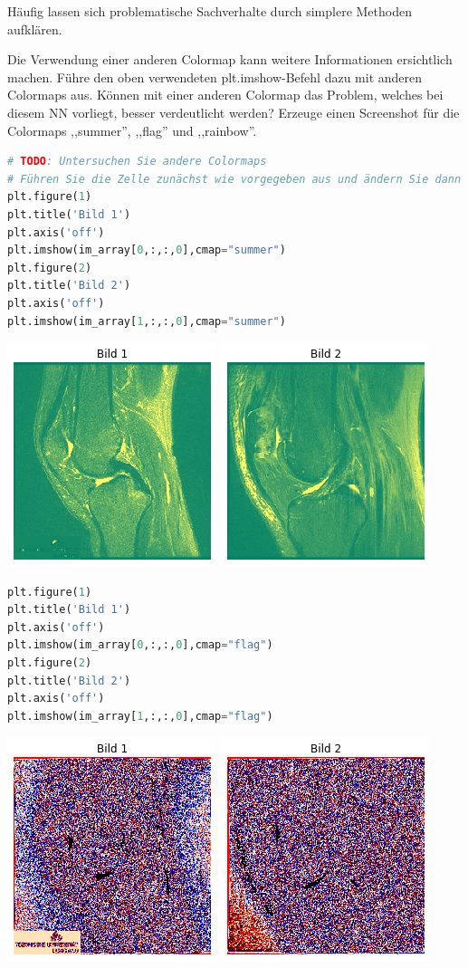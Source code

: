 \documentclass[a4paper,10pt,titlepage]{scrartcl}
\begin{document}
Häufig lassen sich problematische Sachverhalte durch simplere Methoden aufklären.

Die Verwendung einer anderen Colormap kann weitere Informationen ersichtlich machen. Führe den oben verwendeten plt.imshow-Befehl dazu mit anderen Colormaps aus. Können mit einer anderen Colormap das Problem, welches bei diesem NN vorliegt, besser verdeutlicht werden? Erzeuge einen Screenshot für die Colormaps ,,summer'', ,,flag'' und ,,rainbow''.

\begin{lstlisting}[language=python]
# TODO: Untersuchen Sie andere Colormaps
# Führen Sie die Zelle zunächst wie vorgegeben aus und ändern Sie dann die Colormap
plt.figure(1)
plt.title('Bild 1')
plt.axis('off')
plt.imshow(im_array[0,:,:,0],cmap="summer")
plt.figure(2)
plt.title('Bild 2')
plt.axis('off')
plt.imshow(im_array[1,:,:,0],cmap="summer")
\end{lstlisting}
\begin{center}
    \includegraphics[width=.2\linewidth]{Assets/prakBMT-DeepLearning-10.png}
    \includegraphics[width=.2\linewidth]{Assets/prakBMT-DeepLearning-11.png}
\end{center}

\begin{lstlisting}[language=python]
plt.figure(1)
plt.title('Bild 1')
plt.axis('off')
plt.imshow(im_array[0,:,:,0],cmap="flag")
plt.figure(2)
plt.title('Bild 2')
plt.axis('off')
plt.imshow(im_array[1,:,:,0],cmap="flag")
\end{lstlisting}
\begin{center}
    \includegraphics[width=.2\linewidth]{Assets/prakBMT-DeepLearning-12.png}
    \includegraphics[width=.2\linewidth]{Assets/prakBMT-DeepLearning-13.png}
\end{center}
\end{document}
